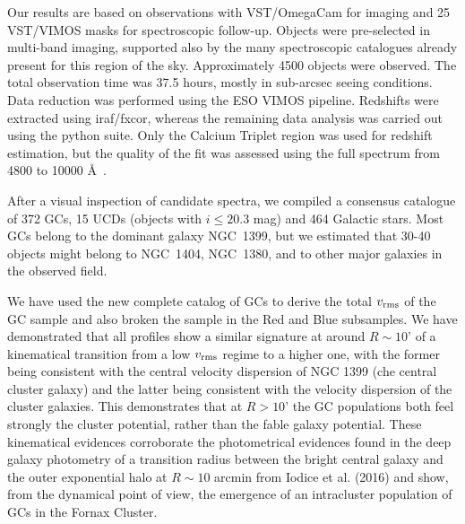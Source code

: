 \documentclass[useAMS,usenatbib]{mn2e}
\begin{document}
Our results are based on observations with VST/OmegaCam for imaging and 25 VST/VIMOS masks for spectroscopic follow-up. Objects were pre-selected in multi-band imaging, supported also by the many spectroscopic catalogues already present for this region of the sky.  Approximately 4500 objects were observed. The total observation time was 37.5 hours, mostly in sub-arcsec seeing conditions. Data reduction was performed using the ESO VIMOS pipeline. Redshifts were extracted using iraf/fxcor, whereas the remaining data analysis was carried out using the python suite. Only the Calcium Triplet region was used for redshift estimation, but the quality of the fit was assessed using the full spectrum from 4800 to 10000 \AA\ .

After a visual inspection of candidate spectra, we compiled a consensus catalogue of 372 GCs, 15 UCDs (objects with $i \le 20.3$ mag) and 464 Galactic stars. Most GCs belong to the dominant galaxy NGC~1399, but we estimated that 30-40 objects might belong to NGC~1404, NGC~1380, and to other major galaxies in the observed field.

We have used the new complete catalog of GCs to derive the total  $v_{\rm rms}$ of the GC sample and also broken the sample in the Red and Blue subsamples. We have demonstrated that all profiles show a similar signature at around $R\sim10’$ of a kinematical transition from a low $v_{\rm rms}$ regime to a higher one, with the former being consistent with the central velocity dispersion of NGC 1399 (che central cluster galaxy) and the latter being consistent with the velocity dispersion of the cluster galaxies. This demonstrates that at $R>10’$ the GC populations both feel strongly the cluster potential, rather than the fable galaxy potential. These kinematical evidences corroborate the photometrical evidences found in the deep galaxy photometry of a transition radius between the bright central galaxy and the outer exponential halo at $R\sim10$ arcmin from Iodice et al. (2016) and show, from the dynamical point of view,  the emergence of an intracluster population of GCs in the Fornax Cluster.




\end{document}
